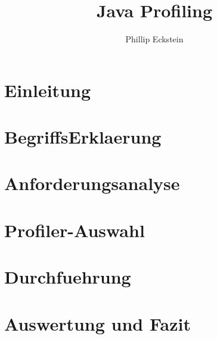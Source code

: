 \documentclass{article}
\author{Phillip Eckstein}
\title{Java Profiling}
\begin{document}
    
\maketitle
\tableofcontents

\pagebreak

\section{Einleitung}

\section{BegriffsErklaerung}

\section{Anforderungsanalyse}

\section{Profiler-Auswahl}

\section{Durchfuehrung}

\section{Auswertung und Fazit}
\end{document}
